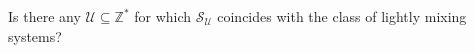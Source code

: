 \documentclass[graybox]{svmult}
\theoremstyle{definition}
\begin{document}
\begin{question}\label{q:LightMixingIsNotUMixing}
    Is there any $\mathcal{U} \subseteq \mathbb{Z}^*$ for which $\mathcal{S}_\mathcal{U}$ coincides with the class of lightly mixing systems?
\end{question}

\begin{center}
	
\end{center}
\end{document}
